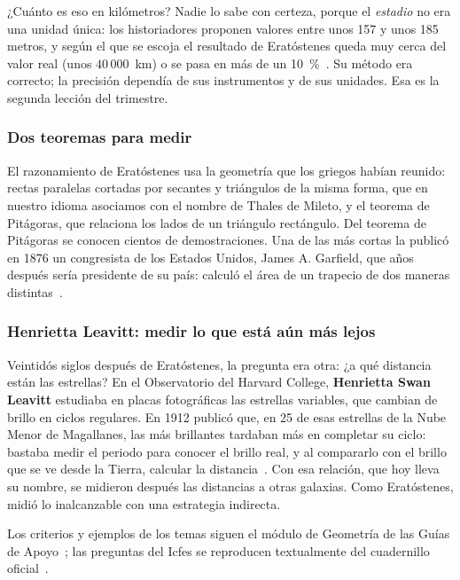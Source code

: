 \documentclass[11pt]{article}
\begin{document}
¿Cuánto es eso en kilómetros? Nadie lo sabe con certeza, porque el
\emph{estadio} no era una unidad única: los historiadores proponen valores entre
unos 157 y unos 185 metros, y según el que se escoja el resultado de Eratóstenes
queda muy cerca del valor real (unos $40\,000$~km) o se pasa en más de un
10~\%~\cite{mactutoreratostenes}. Su método era correcto; la precisión dependía de
sus instrumentos y de sus unidades. Esa es la segunda lección del trimestre.

\subsubsection*{Dos teoremas para medir}

El razonamiento de Eratóstenes usa la geometría que los griegos habían reunido:
rectas paralelas cortadas por secantes y triángulos de la misma forma, que en
nuestro idioma asociamos con el nombre de Thales de Mileto, y el teorema de
Pitágoras, que relaciona los lados de un triángulo rectángulo. Del teorema de
Pitágoras se conocen cientos de demostraciones. Una de las más cortas la publicó
en 1876 un congresista de los Estados Unidos, James A. Garfield, que años después
sería presidente de su país: calculó el área de un trapecio de dos maneras
distintas~\cite{garfield}.

\subsubsection*{Henrietta Leavitt: medir lo que está aún más lejos}

Veintidós siglos después de Eratóstenes, la pregunta era otra: ¿a qué distancia
están las estrellas? En el Observatorio del Harvard College, \textbf{Henrietta Swan
Leavitt} estudiaba en placas fotográficas las estrellas variables, que cambian de
brillo en ciclos regulares. En 1912 publicó que, en 25 de esas estrellas de la
Nube Menor de Magallanes, las más brillantes tardaban más en completar su ciclo:
bastaba medir el periodo para conocer el brillo real, y al compararlo con el brillo
que se ve desde la Tierra, calcular la distancia~\cite{leavitt}. Con esa
relación, que hoy lleva su nombre, se midieron después las distancias a otras
galaxias. Como Eratóstenes, midió lo inalcanzable con una estrategia indirecta.

Los criterios y ejemplos de los temas siguen el módulo de Geometría de las Guías de
Apoyo~\cite{quintero}; las preguntas del Icfes se reproducen textualmente del
cuadernillo oficial~\cite{icfes2026}.
\end{document}
